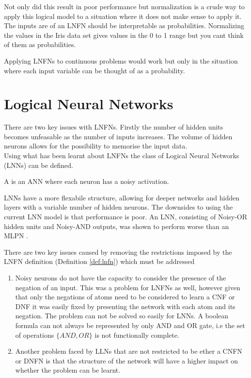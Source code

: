 Not only did this result in poor performance but normalization is a crude way to apply this logical model to a situation where it does not make sense to apply it. The inputs are of an LNFN should be interpretable as probabilities. Normalizing the values in the Iris data set gives values in the 0 to 1 range but you cant think of them as probabilities.

Applying LNFNs to continuous problems would work but only in the situation where each input variable can be thought of as a probability.

\chapter{Logical Neural Networks} \label{C:lnn}
There are two key issues with LNFNs. Firstly the number of hidden units becomes unfeasable as the number of inputs increases. The volume of hidden neurons allows for the possibility to memorise the input data.\\

Using what has been learnt about LNFNs the class of Logical Neural Networks (LNNs) can be defined.

\begin{definition}
	A  is an ANN where each neuron has a noisy activation.
\end{definition}

LNNs have a more flexabile structure, allowing for deeper networks and hidden layers with a variable number of hidden neurons. The downsides to using the current LNN model is that performance is poor. An LNN, consisting of Noisy-OR hidden units and Noisy-AND outputs, was shown to perform worse than an MLPN \cite{LearningLogicalActivations}. 

There are two key issues caused by removing the restrictions imposed by the LNFN definition (Definition \ref{def:lnfn}) which must be addressed 

\begin{enumerate}
	\item Noisy neurons do not have the capacity to consider the presence of the negation of an input. This was a problem for LNFNs as well, however given that only the negations of atoms need to be considered to learn a CNF or DNF it was easily fixed by presenting the network with each atom and its negation. The problem can not be solved so easily for LNNs. A boolean formula can not always be represented by only AND and OR gate, i.e the set of operations $\{AND, OR\}$ is not functionally complete. 
	
	\item Another problem faced by LLNs that are not restricted to be ether a CNFN or DNFN is that the structure of the network will have a higher impact on whether the problem can be learnt. 
\end{enumerate}

